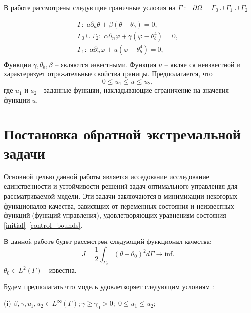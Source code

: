 \documentclass[12pt,a4paper]{article}%
\begin{document}
    В работе рассмотрены следующие граничные условия на $\Gamma := \partial \Omega =\bar{\Gamma_0} \cup \bar{\Gamma_1} \cup \bar{\Gamma_2}$
    
    \begin{equation}
        \label{initial_boundary}
        \begin{aligned}
            \Gamma: \; a \partial_n \theta + \beta (\theta - \theta _b) = 0, \\
            \Gamma_0 \cup \Gamma_2: \; \alpha \partial_n \varphi + \gamma(\varphi - \theta_b ^4 ) = 0, \\
            \Gamma_1: \; \alpha \partial_n \varphi + u(\varphi - \theta_b ^4 ) = 0, \\
        \end{aligned}
    \end{equation}
    Функции $\gamma, \theta_b, \beta$ -- являются известными. Функция $u$ -- является неизвестной и характеризует отражательные свойства границы. Предполагается, что
    \begin{equation}
        \label{control_bounds}
        0 \leq u_1 \leq u \leq u_2,
    \end{equation}
    где $u_1$ и $u_2$ - заданные функции, накладывающие ограничение на значения функции $u$.
    
\section{Постановка обратной экстремальной задачи}

Основной целью данной работы является исседование исследование единственности и устойчивости решений задач оптимального управления для рассматриваемой модели. Эти задачи заключаются в минимизации некоторых функционалов качества, зависящих от переменных состояния и неизвестных функций (функций управления), удовлетворяющих уравнениям состояния \eqref{initial}--\eqref{control_bounds}. 

    В данной работе будет рассмотрен следующий функционал качества:
    \begin{equation}
        \label{quality}
        J = \frac{1}{2} \int_{\Gamma_2} (\theta - \theta_0)^2 d\Gamma \rightarrow \text{inf}.
    \end{equation}
    $\theta_0 \in L^2(\Gamma)$ - известна.


    Будем предполагать что модель удовлетворяет следующим условиям :

(i) $\beta, \gamma, u_1, u_2 \in L^\infty(\Gamma); \gamma \ge \gamma_0 > 0;\; 0 \le u_1 \le u_2;$
\end{document}
